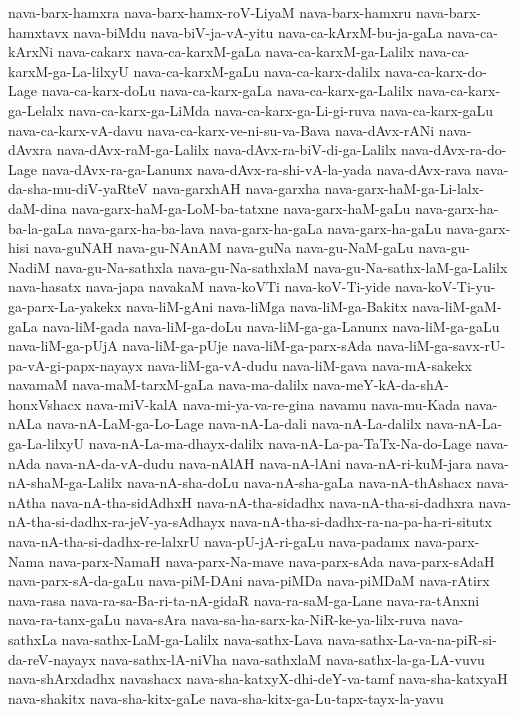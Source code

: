 {nava-barx-hamxra
nava-barx-hamx-roV-LiyaM
nava-barx-hamxru
nava-barx-hamxtavx
nava-biMdu
nava-biV-ja-vA-yitu
nava-ca-kArxM-bu-ja-gaLa
nava-ca-kArxNi
nava-cakarx
nava-ca-karxM-gaLa
nava-ca-karxM-ga-Lalilx
nava-ca-karxM-ga-La-lilxyU
nava-ca-karxM-gaLu
nava-ca-karx-dalilx
nava-ca-karx-do-Lage
nava-ca-karx-doLu
nava-ca-karx-gaLa
nava-ca-karx-ga-Lalilx
nava-ca-karx-ga-Lelalx
nava-ca-karx-ga-LiMda
nava-ca-karx-ga-Li-gi-ruva
nava-ca-karx-gaLu
nava-ca-karx-vA-davu
nava-ca-karx-ve-ni-su-va-Bava
nava-dAvx-rANi
nava-dAvxra
nava-dAvx-raM-ga-Lalilx
nava-dAvx-ra-biV-di-ga-Lalilx
nava-dAvx-ra-do-Lage
nava-dAvx-ra-ga-Lanunx
nava-dAvx-ra-shi-vA-la-yada
nava-dAvx-rava
nava-da-sha-mu-diV-yaRteV
nava-garxhAH
nava-garxha
nava-garx-haM-ga-Li-lalx-daM-dina
nava-garx-haM-ga-LoM-ba-tatxne
nava-garx-haM-gaLu
nava-garx-ha-ba-la-gaLa
nava-garx-ha-ba-lava
nava-garx-ha-gaLa
nava-garx-ha-gaLu
nava-garx-hisi
nava-guNAH
nava-gu-NAnAM
nava-guNa
nava-gu-NaM-gaLu
nava-gu-NadiM
nava-gu-Na-sathxla
nava-gu-Na-sathxlaM
nava-gu-Na-sathx-laM-ga-Lalilx
nava-hasatx
nava-japa
navakaM
nava-koVTi
nava-koV-Ti-yide
nava-koV-Ti-yu-ga-parx-La-yakekx
nava-liM-gAni
nava-liMga
nava-liM-ga-Bakitx
nava-liM-gaM-gaLa
nava-liM-gada
nava-liM-ga-doLu
nava-liM-ga-ga-Lanunx
nava-liM-ga-gaLu
nava-liM-ga-pUjA
nava-liM-ga-pUje
nava-liM-ga-parx-sAda
nava-liM-ga-savx-rU-pa-vA-gi-papx-nayayx
nava-liM-ga-vA-dudu
nava-liM-gava
nava-mA-sakekx
navamaM
nava-maM-tarxM-gaLa
nava-ma-dalilx
nava-meY-kA-da-shA-honxVshacx
nava-miV-kalA
nava-mi-ya-va-re-gina
navamu
nava-mu-Kada
nava-nALa
nava-nA-LaM-ga-Lo-Lage
nava-nA-La-dali
nava-nA-La-dalilx
nava-nA-La-ga-La-lilxyU
nava-nA-La-ma-dhayx-dalilx
nava-nA-La-pa-TaTx-Na-do-Lage
nava-nAda
nava-nA-da-vA-dudu
nava-nAlAH
nava-nA-lAni
nava-nA-ri-kuM-jara
nava-nA-shaM-ga-Lalilx
nava-nA-sha-doLu
nava-nA-sha-gaLa
nava-nA-thAshacx
nava-nAtha
nava-nA-tha-sidAdhxH
nava-nA-tha-sidadhx
nava-nA-tha-si-dadhxra
nava-nA-tha-si-dadhx-ra-jeV-ya-sAdhayx
nava-nA-tha-si-dadhx-ra-na-pa-ha-ri-situtx
nava-nA-tha-si-dadhx-re-lalxrU
nava-pU-jA-ri-gaLu
nava-padamx
nava-parx-Nama
nava-parx-NamaH
nava-parx-Na-mave
nava-parx-sAda
nava-parx-sAdaH
nava-parx-sA-da-gaLu
nava-piM-DAni
nava-piMDa
nava-piMDaM
nava-rAtirx
nava-rasa
nava-ra-sa-Ba-ri-ta-nA-gidaR
nava-ra-saM-ga-Lane
nava-ra-tAnxni
nava-ra-tanx-gaLu
nava-sAra
nava-sa-ha-sarx-ka-NiR-ke-ya-lilx-ruva
nava-sathxLa
nava-sathx-LaM-ga-Lalilx
nava-sathx-Lava
nava-sathx-La-va-na-piR-si-da-reV-nayayx
nava-sathx-lA-niVha
nava-sathxlaM
nava-sathx-la-ga-LA-vuvu
nava-shArxdadhx
navashacx
nava-sha-katxyX-dhi-deY-va-tamf
nava-sha-katxyaH
nava-shakitx
nava-sha-kitx-gaLe
nava-sha-kitx-ga-Lu-tapx-tayx-la-yavu
}
